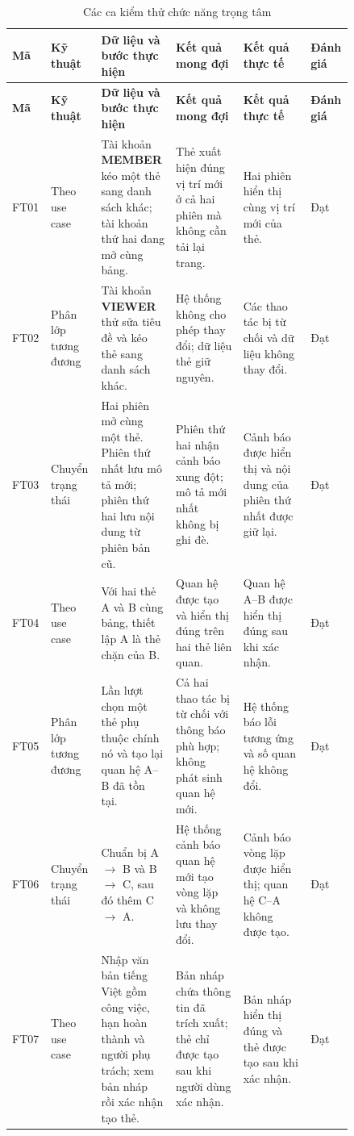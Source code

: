 \documentclass[../DoAn.tex]{subfiles}
\begin{document}
\begingroup
\footnotesize
\setlength{\tabcolsep}{2pt}
\begin{longtable}{|p{0.055\linewidth}|p{0.13\linewidth}|p{0.205\linewidth}|p{0.19\linewidth}|p{0.19\linewidth}|p{0.065\linewidth}|}
    \caption{Các ca kiểm thử chức năng trọng tâm}
    \label{table:chapter4_functional_tests}\\
    \hline
    \textbf{Mã} & \textbf{Kỹ thuật} & \textbf{Dữ liệu và bước thực hiện} & \textbf{Kết quả mong đợi} & \textbf{Kết quả thực tế} & \textbf{Đánh giá} \\ \hline
    \endfirsthead
    \hline
    \textbf{Mã} & \textbf{Kỹ thuật} & \textbf{Dữ liệu và bước thực hiện} & \textbf{Kết quả mong đợi} & \textbf{Kết quả thực tế} & \textbf{Đánh giá} \\ \hline
    \endhead
    FT01 & Theo use case & Tài khoản \textbf{MEMBER} kéo một thẻ sang danh sách khác; tài khoản thứ hai đang mở cùng bảng. & Thẻ xuất hiện đúng vị trí mới ở cả hai phiên mà không cần tải lại trang. & Hai phiên hiển thị cùng vị trí mới của thẻ. & Đạt \\ \hline
    FT02 & Phân lớp tương đương & Tài khoản \textbf{VIEWER} thử sửa tiêu đề và kéo thẻ sang danh sách khác. & Hệ thống không cho phép thay đổi; dữ liệu thẻ giữ nguyên. & Các thao tác bị từ chối và dữ liệu không thay đổi. & Đạt \\ \hline
    FT03 & Chuyển trạng thái & Hai phiên mở cùng một thẻ. Phiên thứ nhất lưu mô tả mới; phiên thứ hai lưu nội dung từ phiên bản cũ. & Phiên thứ hai nhận cảnh báo xung đột; mô tả mới nhất không bị ghi đè. & Cảnh báo được hiển thị và nội dung của phiên thứ nhất được giữ lại. & Đạt \\ \hline
    FT04 & Theo use case & Với hai thẻ A và B cùng bảng, thiết lập A là thẻ chặn của B. & Quan hệ được tạo và hiển thị đúng trên hai thẻ liên quan. & Quan hệ A--B được hiển thị đúng sau khi xác nhận. & Đạt \\ \hline
    FT05 & Phân lớp tương đương & Lần lượt chọn một thẻ phụ thuộc chính nó và tạo lại quan hệ A--B đã tồn tại. & Cả hai thao tác bị từ chối với thông báo phù hợp; không phát sinh quan hệ mới. & Hệ thống báo lỗi tương ứng và số quan hệ không đổi. & Đạt \\ \hline
    FT06 & Chuyển trạng thái & Chuẩn bị A \(\rightarrow\) B và B \(\rightarrow\) C, sau đó thêm C \(\rightarrow\) A. & Hệ thống cảnh báo quan hệ mới tạo vòng lặp và không lưu thay đổi. & Cảnh báo vòng lặp được hiển thị; quan hệ C--A không được tạo. & Đạt \\ \hline
    FT07 & Theo use case & Nhập văn bản tiếng Việt gồm công việc, hạn hoàn thành và người phụ trách; xem bản nháp rồi xác nhận tạo thẻ. & Bản nháp chứa thông tin đã trích xuất; thẻ chỉ được tạo sau khi người dùng xác nhận. & Bản nháp hiển thị đúng và thẻ được tạo sau khi xác nhận. & Đạt \\ \hline

\end{longtable}
\end{document}
